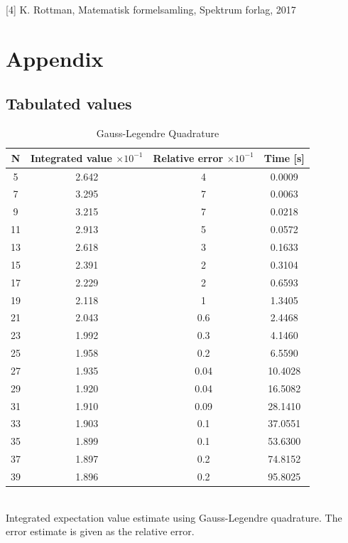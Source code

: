\documentclass[%
reprint,
amsmath,amssymb,
aps,
]{revtex4-1}
\begin{document}
[4] K. Rottman, Matematisk formelsamling, Spektrum forlag, 2017
\newpage 
\section{Appendix}
\subsection{Tabulated values}

\begin{table}[!h]
	\caption {Gauss-Legendre Quadrature} 
	\begin{tabular}{|c|c|c|c|}
		\hline 
		\hspace{5mm} \textbf{N} \hspace{5mm} & \textbf{Integrated value $\times 10^{-1}$} & \hspace{3mm}\textbf{Relative error $\times 10^{-1}$} & \hspace{3mm}\textbf{Time  [s]} \hspace{5mm}\\
		\hline 
			5 & 2.642  & 4  & 0.0009 \\
			7 & 3.295  & 7  & 0.0063 \\
			9 & 3.215  & 7  & 0.0218 \\
			11 & 2.913  & 5  & 0.0572 \\
			13 & 2.618  & 3  & 0.1633 \\
			15 & 2.391  & 2  & 0.3104 \\
			17 & 2.229  & 2  & 0.6593 \\
			19 & 2.118  & 1  & 1.3405 \\
			21 & 2.043  & 0.6  & 2.4468 \\
			23 & 1.992  & 0.3  & 4.1460 \\
			25 & 1.958  & 0.2  & 6.5590 \\
			27 & 1.935  & 0.04  & 10.4028 \\
			29 & 1.920  & 0.04  & 16.5082 \\
			31 & 1.910  & 0.09  & 28.1410 \\
			33 & 1.903  & 0.1  & 37.0551 \\
			35 & 1.899  & 0.1  & 53.6300 \\
			37 & 1.897  & 0.2  & 74.8152 \\
			39 & 1.896  & 0.2  & 95.8025 \\

		\hline 
	\end{tabular} \\ [5pt]
	\label{legendre_values} \centering  Integrated expectation value estimate using Gauss-Legendre quadrature. The error estimate is given as the relative error.
\end{table}
\end{document}
